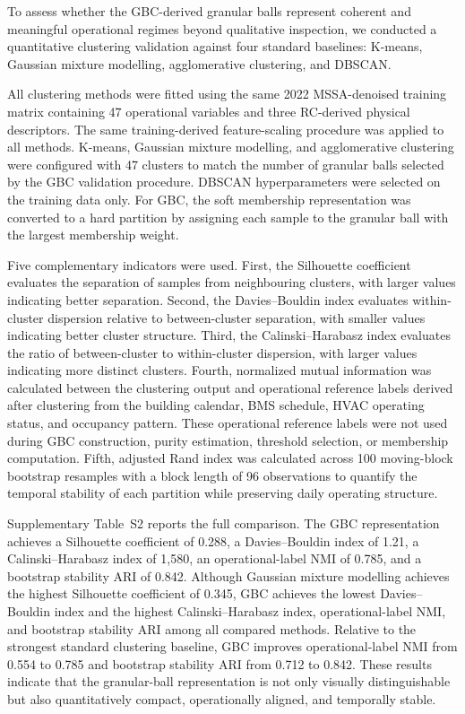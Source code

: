 \documentclass[11pt]{article}
\begin{document}
To assess whether the GBC-derived granular balls represent coherent and meaningful operational regimes beyond qualitative inspection, we conducted a quantitative clustering validation against four standard baselines: K-means, Gaussian mixture modelling, agglomerative clustering, and DBSCAN.

All clustering methods were fitted using the same 2022 MSSA-denoised training matrix containing 47 operational variables and three RC-derived physical descriptors. The same training-derived feature-scaling procedure was applied to all methods. K-means, Gaussian mixture modelling, and agglomerative clustering were configured with 47 clusters to match the number of granular balls selected by the GBC validation procedure. DBSCAN hyperparameters were selected on the training data only. For GBC, the soft membership representation was converted to a hard partition by assigning each sample to the granular ball with the largest membership weight.

Five complementary indicators were used. First, the Silhouette coefficient evaluates the separation of samples from neighbouring clusters, with larger values indicating better separation. Second, the Davies--Bouldin index evaluates within-cluster dispersion relative to between-cluster separation, with smaller values indicating better cluster structure. Third, the Calinski--Harabasz index evaluates the ratio of between-cluster to within-cluster dispersion, with larger values indicating more distinct clusters. Fourth, normalized mutual information was calculated between the clustering output and operational reference labels derived after clustering from the building calendar, BMS schedule, HVAC operating status, and occupancy pattern. These operational reference labels were not used during GBC construction, purity estimation, threshold selection, or membership computation. Fifth, adjusted Rand index was calculated across 100 moving-block bootstrap resamples with a block length of 96 observations to quantify the temporal stability of each partition while preserving daily operating structure.

Supplementary Table~S2 reports the full comparison. The GBC representation achieves a Silhouette coefficient of 0.288, a Davies--Bouldin index of 1.21, a Calinski--Harabasz index of 1,580, an operational-label NMI of 0.785, and a bootstrap stability ARI of 0.842. Although Gaussian mixture modelling achieves the highest Silhouette coefficient of 0.345, GBC achieves the lowest Davies--Bouldin index and the highest Calinski--Harabasz index, operational-label NMI, and bootstrap stability ARI among all compared methods. Relative to the strongest standard clustering baseline, GBC improves operational-label NMI from 0.554 to 0.785 and bootstrap stability ARI from 0.712 to 0.842. These results indicate that the granular-ball representation is not only visually distinguishable but also quantitatively compact, operationally aligned, and temporally stable.
\end{document}
